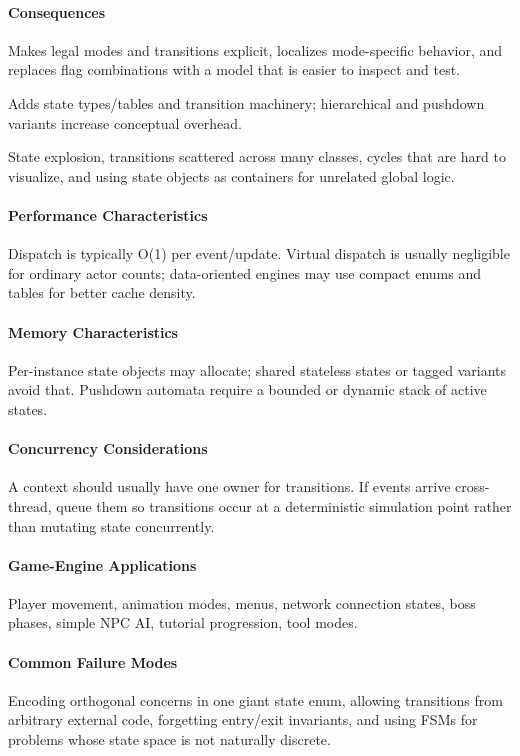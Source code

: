 \documentclass[11pt]{article}
\begin{document}
\paragraph{Consequences}
\begin{description}[leftmargin=2.7cm,style=nextline]
\item[Benefits] Makes legal modes and transitions explicit, localizes mode-specific behavior, and replaces flag combinations with a model that is easier to inspect and test.
\item[Costs] Adds state types/tables and transition machinery; hierarchical and pushdown variants increase conceptual overhead.
\item[Risks] State explosion, transitions scattered across many classes, cycles that are hard to visualize, and using state objects as containers for unrelated global logic.
\end{description}
\paragraph{Performance Characteristics} Dispatch is typically O(1) per event/update. Virtual dispatch is usually negligible for ordinary actor counts; data-oriented engines may use compact enums and tables for better cache density.
\paragraph{Memory Characteristics} Per-instance state objects may allocate; shared stateless states or tagged variants avoid that. Pushdown automata require a bounded or dynamic stack of active states.
\paragraph{Concurrency Considerations} A context should usually have one owner for transitions. If events arrive cross-thread, queue them so transitions occur at a deterministic simulation point rather than mutating state concurrently.
\paragraph{Game-Engine Applications} Player movement, animation modes, menus, network connection states, boss phases, simple NPC AI, tutorial progression, tool modes.
\paragraph{Common Failure Modes} Encoding orthogonal concerns in one giant state enum, allowing transitions from arbitrary external code, forgetting entry/exit invariants, and using FSMs for problems whose state space is not naturally discrete.
\end{document}

